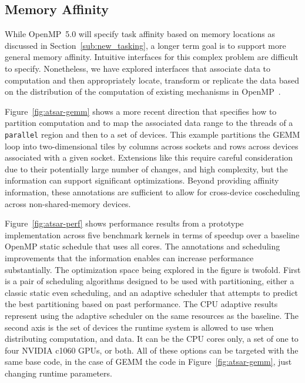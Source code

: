 \subsection{Memory Affinity}
\label{sub:memory_affinity}

While OpenMP~5.0 will specify task affinity based on memory locations 
as discussed in Section~\ref{sub:new_tasking}, a longer term goal is to 
support more general memory affinity. Intuitive interfaces for this complex 
problem are difficult to specify. Nonetheless, we have explored interfaces
that associate data to computation and then appropriately locate, transform 
or replicate the data based on the distribution of the computation of existing
mechanisms in OpenMP~\cite{ctsar-tpds,scogland:7Hpt64iV}.
 
Figure~\ref{fig:atsar-gemm} shows a more recent direction that specifies how
to partition computation and to map the associated data range to the threads 
of a \texttt{parallel} region and then to a set of devices. This example partitions 
the GEMM loop into two-dimensional tiles by columns across sockets and rows 
across devices associated with a given socket. Extensions like this require 
careful consideration due to their potentially large number of changes, and 
high complexity, but the information can support significant optimizations.
Beyond providing affinity information, these annotations are sufficient to 
allow for cross-device coscheduling across non-shared-memory devices.

Figure~\ref{fig:atsar-perf} shows performance results from a prototype 
implementation across five benchmark kernels in terms of speedup over a 
baseline OpenMP static schedule that uses all cores. The annotations and 
scheduling improvements that the information enables can increase performance 
substantially.  The optimization space being explored in the figure is twofold.
First is a pair of scheduling algorithms designed to be used with partitioning,
either a classic static even scheduling, and an adaptive scheduler that attempts
to predict the best partitioning based on past performance.  The CPU adaptive
results represent using the adaptive scheduler on the same resources as the
baseline.  The second axis is the set of devices the runtime system is allowed
to use when distributing computation, and data.  It can be the CPU cores only, a
set of one to four NVIDIA c1060 GPUs, or both.  All of these options can be
targeted with the same base code, in the case of GEMM the code in
Figure~\ref{fig:atsar-gemm}, just changing runtime parameters.


